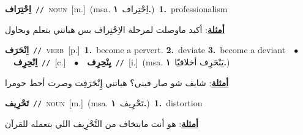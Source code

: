 \documentclass[10pt,a4paper,twoside]{article} %
\begin{document}
\begin{multicols}{2}
{\setlength\topsep{0pt}\textbf{\foreignlanguage{arabic}{اِحْتِرَاف}}\ {\color{gray}\texttt{//}\color{black}}\ \textsc{noun}\ [m.]\ \color{gray}(msa. \foreignlanguage{arabic}{اِحْتِراف}~\foreignlanguage{arabic}{\textbf{١.}})\color{black}\ \textbf{1.}~professionalism\  \begin{flushright}\color{gray}\foreignlanguage{arabic}{\textbf{\underline{\foreignlanguage{arabic}{أمثلة}}}: أكيد ماوصلت لمرحلة الاِحْتِراف بس هياتني بتعلم وبحاول}\end{flushright}\color{black}} \vspace{2mm}

{\setlength\topsep{0pt}\textbf{\foreignlanguage{arabic}{اِنْحَرَف}}\ {\color{gray}\texttt{//}\color{black}}\ \textsc{verb}\ [p.]\ \textbf{1.}~become a pervert.  \textbf{2.}~deviate  \textbf{3.}~become a deviant\ \ $\bullet$\ \ \setlength\topsep{0pt}\textbf{\foreignlanguage{arabic}{اِنْحِرِف}}\ {\color{gray}\texttt{//}\color{black}}\ [c.]\ \ $\bullet$\ \ \setlength\topsep{0pt}\textbf{\foreignlanguage{arabic}{يِنْحِرِف}}\ {\color{gray}\texttt{//}\color{black}}\ [i.]\ \color{gray}(msa. \foreignlanguage{arabic}{يَنْحَرِف أخلاقيّا}~\foreignlanguage{arabic}{\textbf{١.}})\color{black}\  \begin{flushright}\color{gray}\foreignlanguage{arabic}{\textbf{\underline{\foreignlanguage{arabic}{أمثلة}}}: شايف شو صار فيني؟ هياتني إِنْحَرَفِت وصرت أحط حومرا}\end{flushright}\color{black}} \vspace{2mm}

{\setlength\topsep{0pt}\textbf{\foreignlanguage{arabic}{تَحْرِيف}}\ {\color{gray}\texttt{//}\color{black}}\ \textsc{noun}\ [m.]\ \color{gray}(msa. \foreignlanguage{arabic}{تَحْرِِيف}~\foreignlanguage{arabic}{\textbf{١.}})\color{black}\ \textbf{1.}~distortion\  \begin{flushright}\color{gray}\foreignlanguage{arabic}{\textbf{\underline{\foreignlanguage{arabic}{أمثلة}}}: هو أنت مابتخاف من التَّحْرِِيف اللي بتعمله للقرآن}\end{flushright}\color{black}} \vspace{2mm}


\end{multicols}
\end{document}
